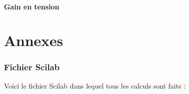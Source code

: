 \documentclass[10pt]{article}
\begin{document}
   \subsection{Gain en tension}


 \newpage
 \part{Annexes}
  \appendix
  \section{Fichier Scilab}
   Voici le fichier Scilab dans lequel tous les calculs sont faits :
   \inputminted[linenos]{matlab}{calculs.sci}
\end{document}
